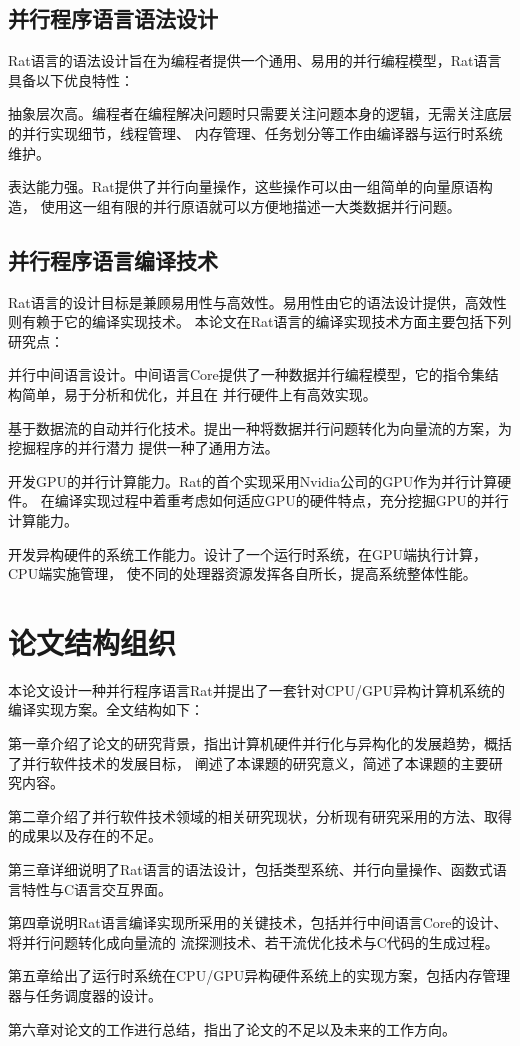 \subsection{并行程序语言语法设计}
Rat语言的语法设计旨在为编程者提供一个通用、易用的并行编程模型，Rat语言具备以下优良特性：
\begin{compactitem}
  \item 抽象层次高。编程者在编程解决问题时只需要关注问题本身的逻辑，无需关注底层的并行实现细节，线程管理、
    内存管理、任务划分等工作由编译器与运行时系统维护。
  \item 表达能力强。Rat提供了并行向量操作，这些操作可以由一组简单的向量原语构造，
    使用这一组有限的并行原语就可以方便地描述一大类数据并行问题。
\end{compactitem}

\subsection{并行程序语言编译技术}
Rat语言的设计目标是兼顾易用性与高效性。易用性由它的语法设计提供，高效性则有赖于它的编译实现技术。
本论文在Rat语言的编译实现技术方面主要包括下列研究点：
\begin{compactitem}
  \item 并行中间语言设计。中间语言Core提供了一种数据并行编程模型，它的指令集结构简单，易于分析和优化，并且在
    并行硬件上有高效实现。
  \item 基于数据流的自动并行化技术。提出一种将数据并行问题转化为向量流的方案，为挖掘程序的并行潜力
    提供一种了通用方法。
  \item 开发GPU的并行计算能力。Rat的首个实现采用Nvidia公司的GPU作为并行计算硬件。
    在编译实现过程中着重考虑如何适应GPU的硬件特点，充分挖掘GPU的并行计算能力。
  \item 开发异构硬件的系统工作能力。设计了一个运行时系统，在GPU端执行计算，CPU端实施管理，
    使不同的处理器资源发挥各自所长，提高系统整体性能。
\end{compactitem}

\section{论文结构组织}
本论文设计一种并行程序语言Rat并提出了一套针对CPU/GPU异构计算机系统的编译实现方案。全文结构如下：

第一章介绍了论文的研究背景，指出计算机硬件并行化与异构化的发展趋势，概括了并行软件技术的发展目标，
阐述了本课题的研究意义，简述了本课题的主要研究内容。

第二章介绍了并行软件技术领域的相关研究现状，分析现有研究采用的方法、取得的成果以及存在的不足。

第三章详细说明了Rat语言的语法设计，包括类型系统、并行向量操作、函数式语言特性与C语言交互界面。

第四章说明Rat语言编译实现所采用的关键技术，包括并行中间语言Core的设计、将并行问题转化成向量流的
流探测技术、若干流优化技术与C代码的生成过程。

第五章给出了运行时系统在CPU/GPU异构硬件系统上的实现方案，包括内存管理器与任务调度器的设计。

第六章对论文的工作进行总结，指出了论文的不足以及未来的工作方向。
